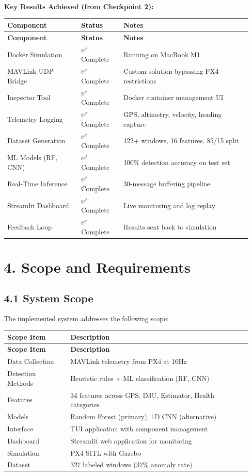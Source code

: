 \documentclass[12pt,a4paper]{article}
\begin{document}
\textbf{Key Results Achieved (from Checkpoint 2):}
\begin{longtable}{|p{4cm}|p{5cm}|p{6cm}|}
\hline
\textbf{Component} & \textbf{Status} & \textbf{Notes} \\
\hline
\endfirsthead
\hline
\textbf{Component} & \textbf{Status} & \textbf{Notes} \\
\hline
\endhead
\hline
Docker Simulation & ✅ Complete & Running on MacBook M1 \\
\hline
MAVLink UDP Bridge & ✅ Complete & Custom solution bypassing PX4 restrictions \\
\hline
Inspector Tool & ✅ Complete & Docker container management UI \\
\hline
Telemetry Logging & ✅ Complete & GPS, altimetry, velocity, heading capture \\
\hline
Dataset Generation & ✅ Complete & 122+ windows, 16 features, 85/15 split \\
\hline
ML Models (RF, CNN) & ✅ Complete & 100\% detection accuracy on test set \\
\hline
Real-Time Inference & ✅ Complete & 30-message buffering pipeline \\
\hline
Streamlit Dashboard & ✅ Complete & Live monitoring and log replay \\
\hline
Feedback Loop & ✅ Complete & Results sent back to simulation \\
\hline
\end{longtable}

\newpage

\section{4. Scope and Requirements}

\subsection{4.1 System Scope}

The implemented system addresses the following scope:

\begin{longtable}{|p{3cm}|p{12cm}|}
\hline
\textbf{Scope Item} & \textbf{Description} \\
\hline
\endfirsthead
\hline
\textbf{Scope Item} & \textbf{Description} \\
\hline
\endhead
\hline
Data Collection & MAVLink telemetry from PX4 at 10Hz \\
\hline
Detection Methods & Heuristic rules + ML classification (RF, CNN) \\
\hline
Features & 34 features across GPS, IMU, Estimator, Health categories \\
\hline
Models & Random Forest (primary), 1D CNN (alternative) \\
\hline
Interface & TUI application with component management \\
\hline
Dashboard & Streamlit web application for monitoring \\
\hline
Simulation & PX4 SITL with Gazebo \\
\hline
Dataset & 327 labeled windows (37\% anomaly rate) \\
\hline
\end{longtable}
\end{document}
